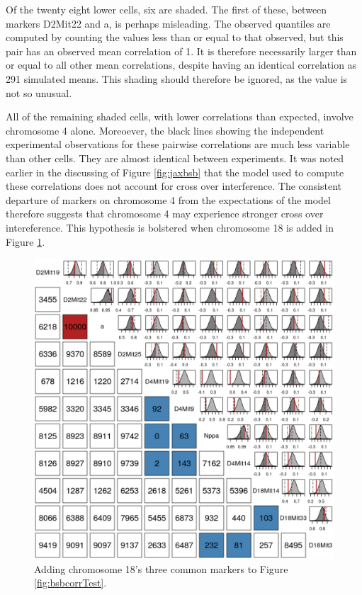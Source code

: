 \documentclass[sts]{imsart}
\begin{document}
Of the twenty eight lower cells, six are shaded. The first of these, between markers D2Mit22 and a, is perhaps misleading. The observed quantiles are computed by counting the values less than or equal to that observed, but this pair has an observed mean correlation of 1. It is therefore necessarily larger than or equal to all other mean correlations, despite having an identical correlation as 291 simulated means. This shading should therefore be ignored, as the value is not so unusual.

All of the remaining shaded cells, with lower correlations than expected, involve chromosome 4 alone. Moreoever, the black lines showing the independent experimental observations for these pairwise correlations are much less variable than other cells. They are almost identical between experiments. It was noted earlier in the discussing of Figure \ref{fig:jaxbsb} that the model used to compute these correlations does not account for cross over interference. The consistent departure of markers on chromosome 4 from the expectations of the model therefore suggests that chromosome 4 may experience stronger cross over intereference. This hypothesis is bolstered when chromosome 18 is added in Figure \ref{fig:bsbcorrTestBig}.

\begin{figure}[htp]
  \begin{center}
      \includegraphics[scale = 0.5]{../img/bsbCorrTestBig.png}
  \end{center}
  \caption{Adding chromosome 18's three common markers to Figure \ref{fig:bsbcorrTest}.}
  \label{fig:bsbcorrTestBig}
\end{figure}
\end{document}
